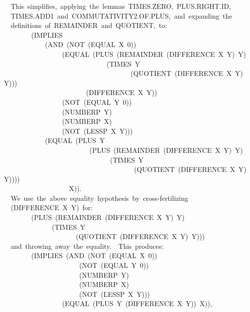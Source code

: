 \documentclass[11pt]{book}
\newenvironment{pubasis}{\begin{flushleft}\ttfamily\small}{\normalsize\rmfamily\end{flushleft}}
\begin{document}
\begin{pubasis}
~~This~simplifies,~applying~the~lemmas~TIMES.ZERO,~PLUS.RIGHT.ID,\\
~~TIMES.ADD1~and~COM\-MU\-TA\-TIV\-ITY2.OF.PLUS,~and~expanding~the\\
~~definitions~of~REMAINDER~and~QUOTIENT,~to:\\

~~~~~~~~(IMPLIES\\
~~~~~~~~~~~~(AND~(NOT~(EQUAL~X~0))\\
~~~~~~~~~~~~~~~~~(EQUAL~(PLUS~(REMAINDER~(DIFFERENCE~X~Y)~Y)\\
~~~~~~~~~~~~~~~~~~~~~~~~~~~~~~(TIMES~Y\\
~~~~~~~~~~~~~~~~~~~~~~~~~~~~~~~~~~~~~(QUOTIENT~(DIFFERENCE~X~Y)~Y)))\\
~~~~~~~~~~~~~~~~~~~~~~~~(DIFFERENCE~X~Y))\\
~~~~~~~~~~~~~~~~~(NOT~(EQUAL~Y~0))\\
~~~~~~~~~~~~~~~~~(NUMBERP~Y)\\
~~~~~~~~~~~~~~~~~(NUMBERP~X)\\
~~~~~~~~~~~~~~~~~(NOT~(LESSP~X~Y)))\\
~~~~~~~~~~~~(EQUAL~(PLUS~Y\\
~~~~~~~~~~~~~~~~~~~~~~~~~(PLUS~(REMAINDER~(DIFFERENCE~X~Y)~Y)\\
~~~~~~~~~~~~~~~~~~~~~~~~~~~~~~~(TIMES~Y\\
~~~~~~~~~~~~~~~~~~~~~~~~~~~~~~~~~~~~~~(QUOTIENT~(DIFFERENCE~X~Y)~Y))))\\
~~~~~~~~~~~~~~~~~~~X)).\\

~~We~use~the~above~equality~hypothesis~by~cross-fertilizing\\
~~(DIFFERENCE~X~Y)~for:\\
~~~~~~~~(PLUS~(REMAINDER~(DIFFERENCE~X~Y)~Y)\\
~~~~~~~~~~~~~~(TIMES~Y\\
~~~~~~~~~~~~~~~~~~~~~(QUOTIENT~(DIFFERENCE~X~Y)~Y)))\\
~~and~throwing~away~the~equality.~~This~produces:\\

~~~~~~~~(IMPLIES~(AND~(NOT~(EQUAL~X~0))\\
~~~~~~~~~~~~~~~~~~~~~~(NOT~(EQUAL~Y~0))\\
~~~~~~~~~~~~~~~~~~~~~~(NUMBERP~Y)\\
~~~~~~~~~~~~~~~~~~~~~~(NUMBERP~X)\\
~~~~~~~~~~~~~~~~~~~~~~(NOT~(LESSP~X~Y)))\\
~~~~~~~~~~~~~~~~~(EQUAL~(PLUS~Y~(DIFFERENCE~X~Y))~X)),\\


\end{pubasis}
\end{document}
